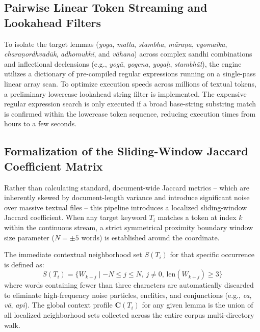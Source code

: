 \documentclass[11pt,twoside,letterpaper]{article}
\begin{document}
\subsection{Pairwise Linear Token Streaming and Lookahead Filters}
To isolate the target lemmas (\textit{yoga}, \textit{malla}, \textit{stambha}, \textit{māraṇa}, \textit{vyomaika}, \textit{charaṇordhvadūk}, \textit{adhomukhī}, and \textit{vāhana}) across complex sandhi combinations and inflectional declensions (e.g., \textit{yogā}, \textit{yogena}, \textit{yogaḥ}, \textit{stambhāt}), the engine utilizes a dictionary of pre-compiled regular expressions running on a single-pass linear array scan. To optimize execution speeds across millions of textual tokens, a preliminary lowercase lookahead string filter is implemented. The expensive regular expression search is only executed if a broad base-string substring match is confirmed within the lowercase token sequence, reducing execution times from hours to a few seconds.

\subsection{Formalization of the Sliding-Window Jaccard Coefficient Matrix}
Rather than calculating standard, document-wide Jaccard metrics -- which are inherently skewed by document-length variance and introduce significant noise over massive textual files -- this pipeline introduces a localized sliding-window Jaccard coefficient. When any target keyword $T_i$ matches a token at index $k$ within the continuous stream, a strict symmetrical proximity boundary window size parameter ($N = \pm 5$ words) is established around the coordinate.

The immediate contextual neighborhood set $S(T_i)$ for that specific occurrence is defined as:
\begin{equation}
S(T_i) = \{W_{k+j} \mid -N \le j \le N, \, j \neq 0, \, \text{len}(W_{k+j}) \ge 3\}
\end{equation}
where words containing fewer than three characters are automatically discarded to eliminate high-frequency noise particles, enclitics, and conjunctions (e.g., \textit{ca}, \textit{vā}, \textit{api}). The global context profile $\mathbf{C}(T_i)$ for any given lemma is the union of all localized neighborhood sets collected across the entire corpus multi-directory walk.
\end{document}
